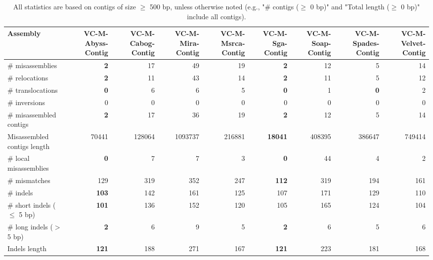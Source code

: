 \documentclass[12pt,a4paper]{article}
\begin{document}
\begin{table}[ht]
\begin{center}
\caption{All statistics are based on contigs of size $\geq$ 500 bp, unless otherwise noted (e.g., "\# contigs ($\geq$ 0 bp)" and "Total length ($\geq$ 0 bp)" include all contigs).}
\begin{tabular}{|l*{8}{|r}|}
\hline
Assembly & VC-M-Abyss-Contig & VC-M-Cabog-Contig & VC-M-Mira-Contig & VC-M-Msrca-Contig & VC-M-Sga-Contig & VC-M-Soap-Contig & VC-M-Spades-Contig & VC-M-Velvet-Contig \\ \hline
\# misassemblies & {\bf 2} & 17 & 49 & 19 & {\bf 2} & 12 & 5 & 14 \\ \hline
\hspace{5mm}\# relocations & {\bf 2} & 11 & 43 & 14 & {\bf 2} & 11 & 5 & 12 \\ \hline
\hspace{5mm}\# translocations & {\bf 0} & 6 & 6 & 5 & {\bf 0} & 1 & {\bf 0} & 2 \\ \hline
\hspace{5mm}\# inversions & 0 & 0 & 0 & 0 & 0 & 0 & 0 & 0 \\ \hline
\# misassembled contigs & {\bf 2} & 17 & 36 & 19 & {\bf 2} & 12 & 5 & 14 \\ \hline
Misassembled contigs length & 70441 & 128064 & 1093737 & 216881 & {\bf 18041} & 408395 & 386647 & 749414 \\ \hline
\# local misassemblies & {\bf 0} & 7 & 7 & 3 & {\bf 0} & 44 & 4 & 2 \\ \hline
\# mismatches & 129 & 319 & 352 & 247 & {\bf 112} & 319 & 194 & 161 \\ \hline
\# indels & {\bf 103} & 142 & 161 & 125 & 107 & 171 & 129 & 110 \\ \hline
\hspace{5mm}\# short indels ($\leq$ 5 bp) & {\bf 101} & 136 & 152 & 120 & 105 & 165 & 124 & 104 \\ \hline
\hspace{5mm}\# long indels ($>$ 5 bp) & {\bf 2} & 6 & 9 & 5 & {\bf 2} & 6 & 5 & 6 \\ \hline
Indels length & {\bf 121} & 188 & 271 & 167 & {\bf 121} & 223 & 181 & 168 \\ \hline
\end{tabular}
\end{center}
\end{table}
\end{document}
